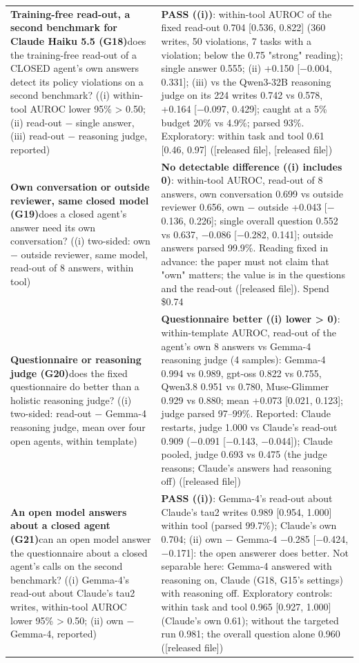 {\begin{longtable}{p{}p{}}
\textbf{Training-free read-out, a second benchmark for Claude Haiku 5.5 (G18)}\newline does the training-free read-out of a CLOSED agent's own answers detect its policy violations on a second benchmark? ((i) within-tool AUROC lower 95\% > 0.50; (ii) read-out $-$ single answer, (iii) read-out $-$ reasoning judge, reported) & \textbf{PASS ((i))}: within-tool AUROC of the fixed read-out 0.704 [0.536, 0.822] (360 writes, 50 violations, 7 tasks with a violation; below the 0.75 "strong" reading); single answer 0.555; (ii) +0.150 [$-$0.004, 0.331]; (iii) vs the Qwen3-32B reasoning judge on its 224 writes 0.742 vs 0.578, +0.164 [$-$0.097, 0.429]; caught at a 5\% budget 20\% vs 4.9\%; parsed 93\%. Exploratory: within task and tool 0.61 [0.46, 0.97] ([released file], [released file])\\[2pt]
\textbf{Own conversation or outside reviewer, same closed model (G19)}\newline does a closed agent's answer need its own conversation? ((i) two-sided: own $-$ outside reviewer, same model, read-out of 8 answers, within tool) & \textbf{No detectable difference ((i) includes 0)}: within-tool AUROC, read-out of 8 answers, own conversation 0.699 vs outside reviewer 0.656, own $-$ outside +0.043 [$-$0.136, 0.226]; single overall question 0.552 vs 0.637, $-$0.086 [$-$0.282, 0.141]; outside answers parsed 99.9\%. Reading fixed in advance: the paper must not claim that "own" matters; the value is in the questions and the read-out ([released file]). Spend \$0.74\\[2pt]
\textbf{Questionnaire or reasoning judge (G20)}\newline does the fixed questionnaire do better than a holistic reasoning judge? ((i) two-sided: read-out $-$ Gemma-4 reasoning judge, mean over four open agents, within template) & \textbf{Questionnaire better ((i) lower > 0)}: within-template AUROC, read-out of the agent's own 8 answers vs Gemma-4 reasoning judge (4 samples): Gemma-4 0.994 vs 0.989, gpt-oss 0.822 vs 0.755, Qwen3.8 0.951 vs 0.780, Muse-Glimmer 0.929 vs 0.880; mean +0.073 [0.021, 0.123]; judge parsed 97--99\%. Reported: Claude restarts, judge 1.000 vs Claude's read-out 0.909 ($-$0.091 [$-$0.143, $-$0.044]); Claude pooled, judge 0.693 vs 0.475 (the judge reasons; Claude's answers had reasoning off) ([released file])\\[2pt]
\textbf{An open model answers about a closed agent (G21)}\newline can an open model answer the questionnaire about a closed agent's calls on the second benchmark? ((i) Gemma-4's read-out about Claude's tau2 writes, within-tool AUROC lower 95\% > 0.50; (ii) own $-$ Gemma-4, reported) & \textbf{PASS ((i))}: Gemma-4's read-out about Claude's tau2 writes 0.989 [0.954, 1.000] within tool (parsed 99.7\%); Claude's own 0.704; (ii) own $-$ Gemma-4 $-$0.285 [$-$0.424, $-$0.171]: the open answerer does better. Not separable here: Gemma-4 answered with reasoning on, Claude (G18, G15's settings) with reasoning off. Exploratory controls: within task and tool 0.965 [0.927, 1.000] (Claude's own 0.61); without the targeted run 0.981; the overall question alone 0.960 ([released file])\\[2pt]

\end{longtable}}

